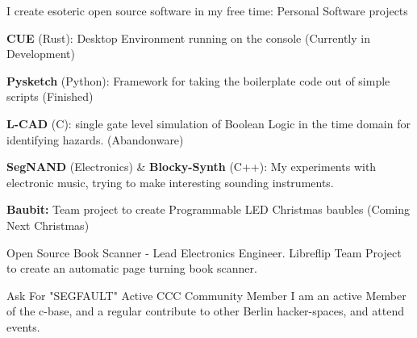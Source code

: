 \documentclass[11pt, a4paper]{awesome-cv}
\begin{document}
\begin{cventries}
  \cventry
    {I create esoteric open source software in my free time:} %
    {Personal Software projects} %
    {}{} %
    {
    \begin{cvitems} %
        \item {\textbf{CUE} (Rust): Desktop Environment running on the console (Currently in Development)}
        \item {\textbf{Pysketch} (Python): Framework for taking the boilerplate code out of simple scripts (Finished)}
        \item {\textbf{L-CAD} (C): single gate level simulation of Boolean Logic in the time domain for identifying hazards. (Abandonware)}
        \item {\textbf{SegNAND} (Electronics) \& \textbf{Blocky-Synth} (C++): My experiments with electronic music, trying to make interesting sounding instruments.}
        \item {\textbf{Baubit:} Team project to create Programmable LED Christmas baubles (Coming Next Christmas)}
      \end{cvitems} 
     }

  \cventry
    {Open Source Book Scanner - Lead Electronics Engineer.} %
    {Libreflip} %
    {}{} %
    {Team Project to create an automatic page turning book scanner.}

  \cventry
    {Ask For "SEGFAULT"} %
    {Active CCC Community Member} %
    {}{} %
    {I am an active Member of the c-base, and a regular contribute to other Berlin hacker-spaces, and attend events.}
\end{cventries}
\end{document}
